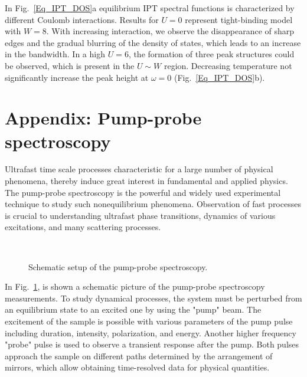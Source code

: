 In Fig.~\ref{Eq_IPT_DOS}a equilibrium IPT spectral functions is characterized by different Coulomb interactions. Results for $U=0$ represent tight-binding model with $W=8$. With increasing interaction, we observe the disappearance of sharp edges and the gradual blurring of the density of states, which leads to an increase in the bandwidth. In a high $U=6$, the formation of three peak structures could be observed, which is present in the $U \sim W$ region. Decreasing temperature not significantly increase the peak height at $\omega=0$ (Fig.~\ref{Eq_IPT_DOS}b).

\FloatBarrier


\section{\label{PP_s}Appendix: Pump-probe spectroscopy}

Ultrafast time scale processes characteristic for a large number of physical phenomena, thereby induce great interest in fundamental and applied physics. The pump-probe spectroscopy \citep{Petek_Ogawa_1997,Axt_2004_Kuhn,ABRAMCZYK2005147} is the powerful and widely used experimental technique to study such nonequilibrium phenomena. Observation of fast processes is crucial to understanding ultrafast phase transitions, dynamics of various excitations, and many scattering processes.




\begin{figure}[h!]
 \\
\caption{Schematic setup of the pump-probe spectroscopy.}
\label{fig:PES_scheme}
\end{figure}

In Fig.~\ref{fig:PES_scheme}, is shown a schematic picture of the pump-probe spectroscopy measurements. To study dynamical processes, the system must be perturbed from an equilibrium state to an excited one by using the "pump" beam. The excitement of the sample is possible with various parameters of the pump pulse including duration, intensity, polarization, and energy. Another higher frequency "probe" pulse is used to observe a transient response after the pump. Both pulses approach the sample on different paths determined by the arrangement of mirrors, which allow obtaining time-resolved data for physical quantities.

